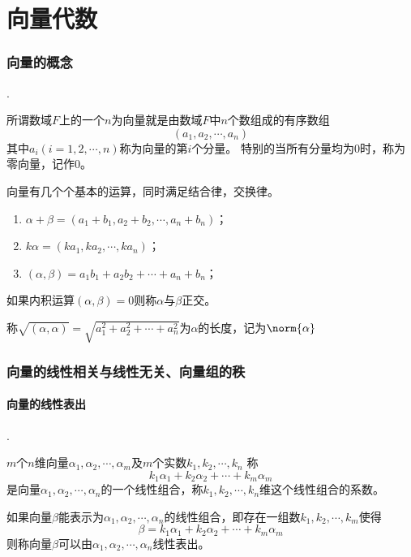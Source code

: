 \part{向量代数}
\section{向量的概念}
.
\begin{definition}
    所谓数域$F$上的一个$n$为向量就是由数域$F$中$n$个数组成的有序数组
    \[ (a_1,a_2,\cdots,a_n) \]
    其中$a_i(i=1,2,\cdots,n)$称为向量的第$i$个分量。
    特别的当所有分量均为$0$时，称为零向量，记作$0$。
\end{definition}
向量有几个个基本的运算，同时满足结合律，交换律。
\begin{enumerate}[(1)]
    \item $\alpha+\beta = (a_1+b_1,a_2+b_2, \cdots, a_n+b_n)$；
    \item $k\alpha = (ka_1,ka_2,\cdots,ka_n)$；
    \item $(\alpha,\beta) = a_1b_1 + a_2b_2 + \cdots + a_n+b_n$；
\end{enumerate}
如果内积运算$(\alpha,\beta)=0$则称$\alpha$与$\beta$正交。

称$\sqrt{(\alpha,\alpha)} = \sqrt{a_1^2 +a_2^2 + \cdots + a_n^2}$为$\alpha$的长度，记为$\norm{\alpha}$

\section{向量的线性相关与线性无关、向量组的秩}
\subsection{向量的线性表出}
.
\begin{definition}
    $m$个$n$维向量$\alpha_1,\alpha_2,\cdots,\alpha_m$及$m$个实数$k_1,k_2,\cdots,k_n$
    称
    \[ k_1\alpha_1 + k_2\alpha_2 + \cdots + k_m\alpha_m \]
    是向量$\alpha_1,\alpha_2,\cdots,\alpha_n$的一个线性组合，称$k_1,k_2,\cdots,k_n$维这个线性组合的系数。
\end{definition}

\begin{definition}
    如果向量$\beta$能表示为$\alpha_1,\alpha_2,\cdots,\alpha_n$的线性组合，即存在一组数$k_1,k_2,\cdots,k_m$使得
    \[ \beta = k_1\alpha_1 + k_2\alpha_2 + \cdots + k_m\alpha_m \]
    则称向量$\beta$可以由$\alpha_1,\alpha_2,\cdots,\alpha_n$线性表出。
\end{definition}

